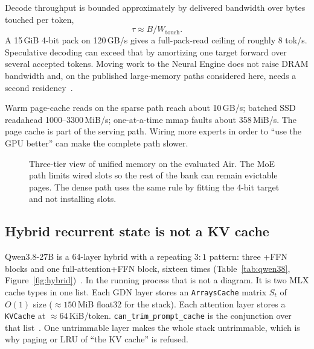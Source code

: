 Decode throughput is bounded approximately by delivered bandwidth over bytes touched per token,
\begin{equation}
\tau \approx B / W_{\mathrm{touch}}.
\label{eq:tau}
\end{equation}
A 15\,GiB 4-bit pack on 120\,GB/s gives a full-pack-read ceiling of roughly $8$ tok/s. Speculative decoding can exceed that by amortizing one target forward over several accepted tokens. Moving work to the Neural Engine does not raise DRAM bandwidth and, on the published large-memory paths considered here, needs a second residency~\citep{weschera2026,omlx2874}.

Warm page-cache reads on the sparse path reach about 10\,GB/s; batched SSD readahead 1000--3300\,MiB/s; one-at-a-time mmap faults about 358\,MiB/s. The page cache is part of the serving path. Wiring more experts in order to ``use the GPU better'' can make the complete path slower.

\begin{figure}[t]
\centering
{}
\caption{Three-tier view of unified memory on the evaluated Air. The MoE path limits wired slots so the rest of the bank can remain evictable pages. The dense path uses the same rule by fitting the 4-bit target and not installing slots.}
\label{fig:tiers}
\end{figure}

\subsection{Hybrid recurrent state is not a KV cache}
\label{sec:hybrid}

Qwen3.8-27B is a 64-layer hybrid with a repeating $3{:}1$ pattern: three \gdn{}+FFN blocks and one full-attention+FFN block, sixteen times (Table~\ref{tab:qwen38}, Figure~\ref{fig:hybrid})~\citep{qwen38card,yang2024gateddelta}. In the running process that is not a diagram. It is two MLX cache types in one list. Each GDN layer stores an \texttt{ArraysCache} matrix $S_t$ of $O(1)$ size (${\approx}150$\,MiB float32 for the stack). Each attention layer stores a \texttt{KVCache} at ${\approx}64$\,KiB/token. \texttt{can\_trim\_prompt\_cache} is the conjunction over that list~\citep{mlxlmcache}. One untrimmable layer makes the whole stack untrimmable, which is why paging or LRU of ``the KV cache'' is refused.

